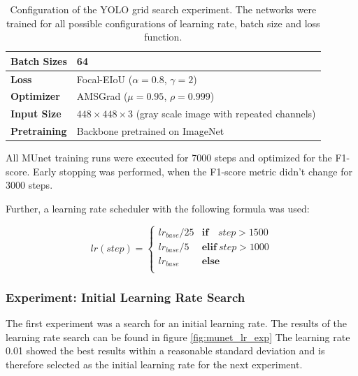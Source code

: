 \begin{table}[H]
\footnotesize
\begin{center}
\begin{tabular}{|l|l|}

\hline
\textbf{Batch Sizes} & 64\\
\hline
\textbf{Loss} & Focal-EIoU ($\alpha = 0.8$, $\gamma = 2$) \\
\hline
\textbf{Optimizer} & AMSGrad ($\mu = 0.95$, $\rho = 0.999$) \\
\hline
\textbf{Input Size} & $448 \times 448 \times 3$ (gray scale image with repeated channels) \\
\hline
\textbf{Pretraining} & Backbone pretrained on ImageNet \\
\hline

\end{tabular}
\caption{Configuration of the YOLO grid search experiment. The networks were trained for all possible configurations of learning rate, batch size and loss function.}
\label{tab:munet_config}
\end{center}
\end{table}

All \ac{MUnet} training runs were executed for 7000 steps and optimized for the F1-score.
Early stopping was performed, when the F1-score metric didn't change for 3000 steps.

Further, a learning rate scheduler with the following formula was used:

\begin{equation}
    lr(step) =
    \begin{cases}
        lr_{base} / 25 & \textbf{if } \ \ \ step > 1500 \\
        lr_{base} / 5  & \textbf{elif}\ step > 1000 \\
        lr_{base}      & \textbf{else} \\
    \end{cases}
\end{equation}

\subsubsection{Experiment: Initial Learning Rate Search}

The first experiment was a search for an initial learning rate.
The results of the learning rate search can be found in figure \ref{fig:munet_lr_exp}
The learning rate 0.01 showed the best results within a reasonable standard deviation and is therefore selected as the initial learning rate for the next experiment.

